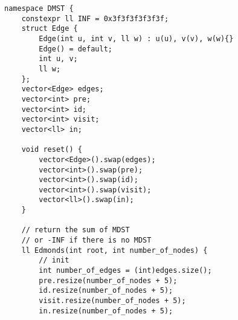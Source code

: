 \documentclass[10pt]{article}{\twocolumn}
\begin{document}
\begin{lstlisting}
namespace DMST {
    constexpr ll INF = 0x3f3f3f3f3f3f;
    struct Edge {
        Edge(int u, int v, ll w) : u(u), v(v), w(w){}
        Edge() = default;
        int u, v;
        ll w;
    };
    vector<Edge> edges;
    vector<int> pre;
    vector<int> id;
    vector<int> visit;
    vector<ll> in;

    void reset() {
        vector<Edge>().swap(edges);
        vector<int>().swap(pre);
        vector<int>().swap(id);
        vector<int>().swap(visit);
        vector<ll>().swap(in);
    }

    // return the sum of MDST
    // or -INF if there is no MDST
    ll Edmonds(int root, int number_of_nodes) {
        // init
        int number_of_edges = (int)edges.size();
        pre.resize(number_of_nodes + 5);
        id.resize(number_of_nodes + 5);
        visit.resize(number_of_nodes + 5);
        in.resize(number_of_nodes + 5);


\end{lstlisting}
\end{document}
